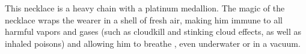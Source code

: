 {%
 This necklace is a heavy chain with a platinum medallion. The magic of the necklace wraps the wearer in a shell of fresh air, making him immune to all harmful vapors and gases (such as cloudkill and stinking cloud effects, as well as inhaled poisons) and allowing him to breathe , even underwater or in a vacuum.


\begin{comment}
Necklace of Fireballs} This device appears to be nothing but beads on a string, sometimes with the ends tied together to form a necklace. (It does not count as an item worn around the neck for the purpose of determining which of a character's worn magic items is effective.) If a character holds it, however, all can see the strand as it really is - a golden chain from which hang a number of golden spheres. The spheres are detachable by the wearer (and only by the wearer), who can easily hurl one of them up to 70 feet. When a sphere arrives at the end of its trajectory, it detonates as a fireball spell (Reflex DR 14 half ).

Spheres come in different strengths, ranging from those that deal 2d6 points of fire damage to those that deal 10d6. The market price of a sphere is 150 gp for each die of damage it deals.

Each necklace of fireballs contains a combination of spheres of various strengths. Some traditional combinations, designated types I through VII, are detailed below.

Necklace & 10d6 & 9d6 & 8d6 & 7d6 & 6d6 & 5d6 & 4d6 & 3d6 & 2d6 & Market Price \\
Type I &  -  &  -  &  -  &  -  &  -  & 1 &  -  & 2 &  -  & 1,650 gp \\
Type II &  -  &  -  &  -  &  -  & 1 &  -  & 2 &  -  & 2 & 2,700 gp \\
Type III &  -  &  -  &  -  & 1 &  -  & 2 &  -  & 4 &  -  & 4,350 gp \\
Type IV &  -  &  -  & 1 &  -  & 2 &  -  & 2 &  -  & 4 & 5,400 gp \\
Type V &  -  & 1 &  -  & 2 &  -  & 2 &  -  & 2 &  -  & 5,850 gp \\
Type VI & 1 &  -  & 2 &  -  & 2 &  -  & 4 &  -  &  -  & 8,100 gp \\
Type VII & 1 & 2 &  -  & 2 &  -  & 2 &  -  & 2 &  -  & 8,700 gp &


\end{comment}}
